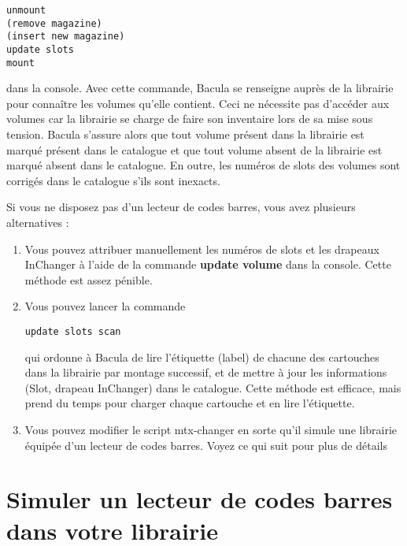 \footnotesize
\begin{verbatim}
unmount
(remove magazine)
(insert new magazine)
update slots
mount
\end{verbatim}
\normalsize

dans la console. Avec cette commande, Bacula se renseigne aupr\`es de la librairie 
pour conna\^itre les volumes qu'elle contient. Ceci ne n\'ecessite pas d'acc\'eder 
aux volumes car la librairie se charge de faire son inventaire lors de sa 
mise sous tension. Bacula s'assure alors que tout volume pr\'esent dans la 
librairie est marqu\'e pr\'esent dans le catalogue et que tout volume absent de la 
librairie est marqu\'e absent dans le catalogue. En outre, les num\'eros de slots 
des volumes sont corrig\'es dans le catalogue s'ils sont inexacts.

Si vous ne disposez pas d'un lecteur de codes barres, vous avez plusieurs alternatives :

\begin{enumerate}
\item Vous pouvez attribuer manuellement les num\'eros de slots et les drapeaux 
  InChanger \`a l'aide de la commande {\bf update volume} dans la console. Cette 
  m\'ethode est assez p\'enible.

\item Vous pouvez lancer la commande 

\footnotesize
\begin{verbatim}
update slots scan
\end{verbatim}
\normalsize
   
   qui ordonne \`a Bacula de lire l'\'etiquette (label) de chacune des cartouches 
   dans la librairie par montage successif, et de mettre \`a jour les informations 
   (Slot, drapeau InChanger) dans le catalogue. Cette m\'ethode est efficace, mais 
   prend du temps pour charger chaque cartouche et en lire l'\'etiquette.

\item Vous pouvez modifier le script  mtx-changer en sorte qu'il simule une 
  librairie \'equip\'ee d'un lecteur de codes barres. Voyez ce qui suit pour plus de 
  d\'etails 
\end{enumerate}

\label{simulating}
\section{Simuler un lecteur de codes barres dans votre librairie}

